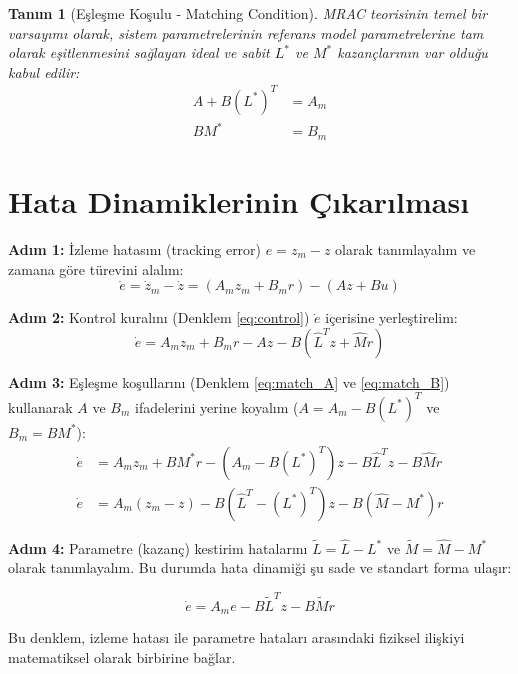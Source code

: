 \documentclass[12pt,a4paper]{article}
\newtheorem{definition}{Tanım}
\begin{document}
\begin{definition}[Eşleşme Koşulu - Matching Condition]
MRAC teorisinin temel bir varsayımı olarak, sistem parametrelerinin referans model parametrelerine tam olarak eşitlenmesini sağlayan ideal ve sabit $L^*$ ve $M^*$ kazançlarının var olduğu kabul edilir:
\begin{align}
    A + B (L^*)^T &= A_m \label{eq:match_A} \\
    B M^* &= B_m \label{eq:match_B}
\end{align}
\end{definition}

\section{Hata Dinamiklerinin Çıkarılması}
\textbf{Adım 1:} İzleme hatasını (tracking error) $e = z_m - z$ olarak tanımlayalım ve zamana göre türevini alalım:
\begin{equation}
    \dot{e} = \dot{z}_m - \dot{z} = (A_m z_m + B_m r) - (A z + B u)
\end{equation}

\textbf{Adım 2:} Kontrol kuralını (Denklem \ref{eq:control}) $\dot{e}$ içerisine yerleştirelim:
\begin{equation}
    \dot{e} = A_m z_m + B_m r - A z - B (\hat{L}^T z + \hat{M} r)
\end{equation}

\textbf{Adım 3:} Eşleşme koşullarını (Denklem \ref{eq:match_A} ve \ref{eq:match_B}) kullanarak $A$ ve $B_m$ ifadelerini yerine koyalım ($A = A_m - B (L^*)^T$ ve $B_m = B M^*$):
\begin{align}
    \dot{e} &= A_m z_m + B M^* r - (A_m - B (L^*)^T) z - B \hat{L}^T z - B \hat{M} r \nonumber \\
    \dot{e} &= A_m (z_m - z) - B (\hat{L}^T - (L^*)^T) z - B (\hat{M} - M^*) r
\end{align}

\textbf{Adım 4:} Parametre (kazanç) kestirim hatalarını $\tilde{L} = \hat{L} - L^*$ ve $\tilde{M} = \hat{M} - M^*$ olarak tanımlayalım. Bu durumda hata dinamiği şu sade ve standart forma ulaşır:
\begin{mdframed}[backgroundcolor=blue!5, linecolor=blue!60!black, roundcorner=5pt]
\begin{equation}
    \dot{e} = A_m e - B \tilde{L}^T z - B \tilde{M} r
    \label{eq:error_dyn}
\end{equation}
\end{mdframed}
Bu denklem, izleme hatası ile parametre hataları arasındaki fiziksel ilişkiyi matematiksel olarak birbirine bağlar.
\end{document}
